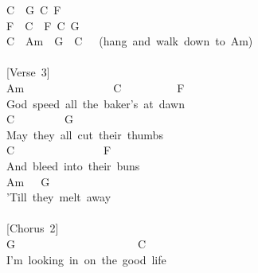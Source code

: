\documentclass[]{book}
\begin{document}
C~~G~C~F\\
F~~C~~F~C~G\\
C~~Am~~G~~C~~~(hang~and~walk~down~to~Am)\\
~\\
{[}Verse~3{]}\\
Am~~~~~~~~~~~~~~~~C~~~~~~~~~~F\\
God~speed~all~the~baker's~at~dawn\\
\hspace*{0.333em}\hspace*{0.333em}\hspace*{0.333em}\hspace*{0.333em}\hspace*{0.333em}\hspace*{0.333em}\hspace*{0.333em}\hspace*{0.333em}\hspace*{0.333em}\hspace*{0.333em}\hspace*{0.333em}\hspace*{0.333em}\hspace*{0.333em}C~~~~~~~~~G\\
May~they~all~cut~their~thumbs\\
\hspace*{0.333em}\hspace*{0.333em}\hspace*{0.333em}\hspace*{0.333em}C~~~~~~~~~~~~~~~~F\\
And~bleed~into~their~buns\\
\hspace*{0.333em}\hspace*{0.333em}\hspace*{0.333em}\hspace*{0.333em}\hspace*{0.333em}\hspace*{0.333em}\hspace*{0.333em}\hspace*{0.333em}\hspace*{0.333em}\hspace*{0.333em}\hspace*{0.333em}Am~~~G\\
'Till~they~melt~away\\
~\\
{[}Chorus~2{]}\\
G~~~~~~~~~~~~~~~~~~~~~~C\\
I'm~looking~in~on~the~good~life\\
\end{document}
